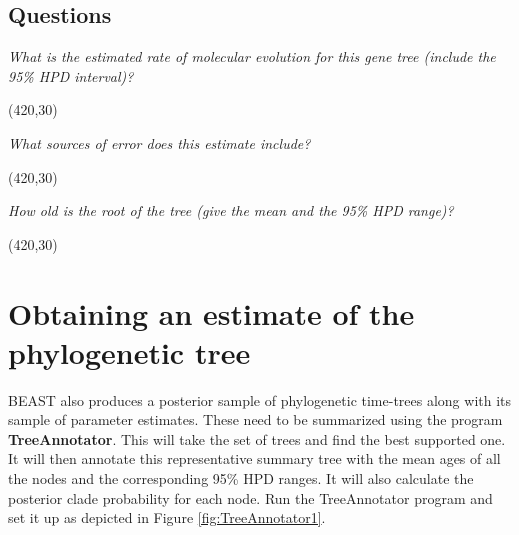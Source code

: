 \documentclass[11pt]{article}
\theoremstyle{plain}%
\theoremstyle{definition}
\theoremstyle{remark}
\begin{document}
\subsection*{Questions}
\vspace{5 mm}

\textit{What is the estimated rate of molecular evolution for this gene tree (include the 95\% HPD interval)?}

\vspace{5 mm}
\framebox(420,30){}
\vspace{5 mm}

\textit{What sources of error does this estimate include?}

\vspace{5 mm}
\framebox(420,30){}
\vspace{5 mm}


\textit{How old is the root of the tree (give the mean and the 95\% HPD range)?}

\vspace{5 mm}
\framebox(420,30){}
\vspace{5 mm}
  
%   
%
%
%
%


\section{Obtaining an estimate of the phylogenetic tree}

BEAST also produces a posterior sample of phylogenetic time-trees along with its sample of parameter estimates. 
These need to be summarized using the program {\bf TreeAnnotator}. This will take the set of trees and find the best
supported one. It will then annotate this representative summary tree with the mean ages of all the
nodes and the corresponding 95\% HPD ranges. It will also calculate the posterior clade probability for each
node. Run the TreeAnnotator program and set it up as depicted in Figure \ref{fig:TreeAnnotator1}.
\end{document}
